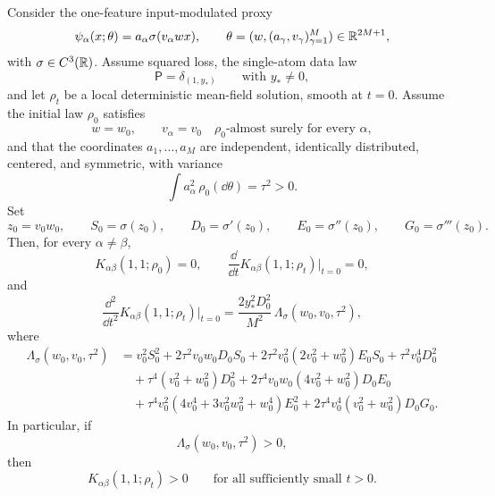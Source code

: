 \begin{proposition}
\label{prop:input-modulated-small-time}
Consider the one-feature input-modulated proxy
\begin{equation}
  \psi_\alpha(x;\theta)=a_\alpha \sigma(v_\alpha w x),
  \qquad
  \theta=(w,(a_\gamma,v_\gamma)_{\gamma=1}^M)\in \mathbb{R}^{2M+1},
  \label{eq:input-modulated-proxy}
\end{equation}
with $\sigma\in C^3(\mathbb{R})$.
Assume squared loss, the single-atom data law
\[
  \mathsf P=\delta_{(1,y_*)}
  \qquad
  \text{with } y_*\neq 0,
\]
and let $\rho_t$ be a local deterministic mean-field solution, smooth at $t=0$.
Assume the initial law $\rho_0$ satisfies
\[
  w=w_0,
  \qquad
  v_\alpha=v_0
  \quad
  \rho_0\text{-almost surely for every }\alpha,
\]
and that the coordinates $a_1,\dots,a_M$ are independent, identically distributed, centered, and symmetric, with variance
\[
  \int a_\alpha^2\,\rho_0(\dd \theta)=\tau^2>0.
\]
Set
\[
  z_0=v_0w_0,
  \qquad
  S_0=\sigma(z_0),
  \qquad
  D_0=\sigma'(z_0),
  \qquad
  E_0=\sigma''(z_0),
  \qquad
  G_0=\sigma'''(z_0).
\]
Then, for every $\alpha\neq\beta$,
\[
  K_{\alpha\beta}(1,1;\rho_0)=0,
  \qquad
  \frac{\dd}{\dd t}K_{\alpha\beta}(1,1;\rho_t)\Big|_{t=0}=0,
\]
and
\begin{equation}
  \frac{\dd^2}{\dd t^2}K_{\alpha\beta}(1,1;\rho_t)\Big|_{t=0}
  =
  \frac{2y_*^2 D_0^2}{M^2}\,
  \Lambda_\sigma(w_0,v_0,\tau^2),
  \label{eq:input-modulated-second}
\end{equation}
where
\begin{align}
  \Lambda_\sigma(w_0,v_0,\tau^2)
  &=
  v_0^2 S_0^2
  +
  2\tau^2 v_0 w_0 D_0 S_0
  +
  2\tau^2 v_0^2(2v_0^2+w_0^2)E_0 S_0
  +
  \tau^2 v_0^4 D_0^2
  \nonumber\\
  &\quad
  +
  \tau^4(v_0^2+w_0^2)D_0^2
  +
  2\tau^4 v_0 w_0(4v_0^2+w_0^2)D_0E_0
  \nonumber\\
  &\quad
  +
  \tau^4 v_0^2(4v_0^4+3v_0^2w_0^2+w_0^4)E_0^2
  +
  2\tau^4 v_0^4(v_0^2+w_0^2)D_0G_0.
  \label{eq:lambda-sigma-modulated}
\end{align}
In particular, if
\[
  \Lambda_\sigma(w_0,v_0,\tau^2)>0,
\]
then
\[
  K_{\alpha\beta}(1,1;\rho_t)>0
  \qquad
  \text{for all sufficiently small }t>0.
\]
\end{proposition}

